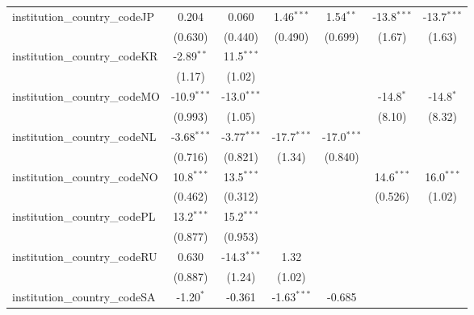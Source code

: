 \begin{tabular}{lcccccc}
   institution\_country\_codeJP          & 0.204         & 0.060         & 1.46$^{***}$  & 1.54$^{**}$   & -13.8$^{***}$ & -13.7$^{***}$\\   
                                         & (0.630)       & (0.440)       & (0.490)       & (0.699)       & (1.67)        & (1.63)\\   
   institution\_country\_codeKR          & -2.89$^{**}$  & 11.5$^{***}$  &               &               &               &   \\   
                                         & (1.17)        & (1.02)        &               &               &               &   \\   
   institution\_country\_codeMO          & -10.9$^{***}$ & -13.0$^{***}$ &               &               & -14.8$^{*}$   & -14.8$^{*}$\\   
                                         & (0.993)       & (1.05)        &               &               & (8.10)        & (8.32)\\   
   institution\_country\_codeNL          & -3.68$^{***}$ & -3.77$^{***}$ & -17.7$^{***}$ & -17.0$^{***}$ &               &   \\   
                                         & (0.716)       & (0.821)       & (1.34)        & (0.840)       &               &   \\   
   institution\_country\_codeNO          & 10.8$^{***}$  & 13.5$^{***}$  &               &               & 14.6$^{***}$  & 16.0$^{***}$\\   
                                         & (0.462)       & (0.312)       &               &               & (0.526)       & (1.02)\\   
   institution\_country\_codePL          & 13.2$^{***}$  & 15.2$^{***}$  &               &               &               &   \\   
                                         & (0.877)       & (0.953)       &               &               &               &   \\   
   institution\_country\_codeRU          & 0.630         & -14.3$^{***}$ & 1.32          &               &               &   \\   
                                         & (0.887)       & (1.24)        & (1.02)        &               &               &   \\   
   institution\_country\_codeSA          & -1.20$^{*}$   & -0.361        & -1.63$^{***}$ & -0.685        &               &   \\   

\end{tabular}
